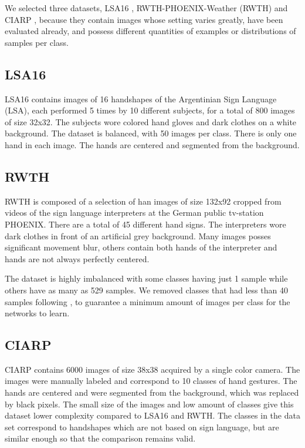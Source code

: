 We selected three datasets, LSA16 \cite{Ronchetti2016}, RWTH-PHOENIX-Weather (RWTH) \cite{koller16:deephand} and CIARP \cite{ciarp2018}, because they contain images whose setting varies greatly, have been evaluated already, and possess different quantities of examples or distributions of samples per class.

\subsection{LSA16} LSA16 \cite{Ronchetti2016} contains images of 16 handshapes of the Argentinian Sign Language (LSA), each performed 5 times by 10 different subjects, for a total of 800 images of size 32x32. The subjects wore colored hand gloves and dark clothes on a white background. The dataset is balanced, with 50 images per class. There is only one hand in each image. The hands are centered and segmented from the background.

\subsection{RWTH} RWTH \cite{koller16:deephand} is composed of a selection of  han images of size 132x92 cropped from  videos of the sign language interpreters at the German public tv-station PHOENIX. There are a total of 45 different hand signs. The interpreters wore dark clothes in front of an artificial grey background. Many images posses significant movement blur, others contain both hands of the interpreter and hands are not always perfectly centered.

The dataset is highly imbalanced with some classes having just 1 sample while others have as many as 529 samples. We removed classes that had less than 40 samples following \cite{quiroga2017study}, to guarantee a minimum amount of images per class for the networks to learn.

\subsection{CIARP} CIARP \cite{ciarp2018} contains 6000 images of size 38x38 acquired by a single color camera. The images were manually labeled and correspond to 10 classes of hand gestures. The hands are centered and were segmented from the background, which was replaced by black pixels. The small size of the images and low amount of classes give this dataset lower complexity compared to LSA16 and RWTH. The classes in the data set correspond to handshapes which are not based on sign language, but are similar enough  so that the comparison remains valid.

